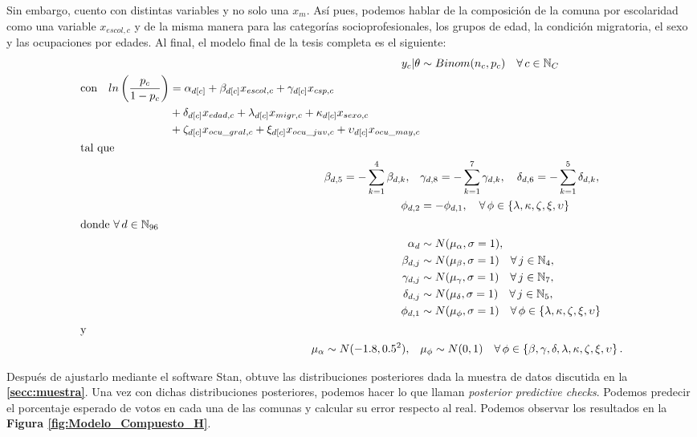 Sin embargo, cuento con distintas variables y no solo una $x_m$. Así pues, podemos hablar de la composición de la comuna por escolaridad como una variable $x_{escol,c}$ y de la misma manera para las categorías socioprofesionales, los grupos de edad, la condición migratoria, el sexo y las ocupaciones por edades. Al final, el modelo final de la tesis completa es el siguiente: 
\begin{align}\label{eq:Modelo_Comp_H}
y_c|\theta & \sim Binom(n_c,p_c) \quad \forall \, c \in \mathbb{N}_C \nonumber \\
\begin{split}
\text{con} \quad ln\left(\dfrac{p_c}{1-p_c}\right) &= \alpha_{d[c]} + \beta_{d[c]} x_{escol,c} + \gamma_{d[c]} x_{csp,c} \\
&+ \delta_{d[c]} x_{edad,c} + \lambda_{d[c]} x_{migr,c} + \kappa_{d[c]} x_{sexo,c} \\
&+ \zeta_{d[c]} x_{ocu\_gral,c} + \xi_{d[c]} x_{ocu\_juv,c} + \upsilon_{d[c]} x_{ocu\_may,c} 
\end{split}\\
\shortintertext{tal que} 
\beta_{d,5} = -\sum\limits_{k = 1}^{4} \beta_{d,k}, \quad &\gamma_{d,8} = -\sum\limits_{k = 1}^{7} \gamma_{d,k}, \quad \delta_{d,6} = -\sum\limits_{k = 1}^{5} \delta_{d,k}, \nonumber \\ 
\phi_{d,2} &= -\phi_{d,1}, \quad \forall \, \phi \in \left\lbrace \lambda, \kappa, \zeta, \xi, \upsilon \right\rbrace \nonumber \\
\shortintertext{donde $\forall \, d \in \mathbb{N}_{96}$}
\alpha_d &\sim N(\mu_{\alpha}, \sigma=1), \nonumber \\ 
\beta_{d,j} &\sim N(\mu_{\beta}, \sigma=1) \quad \forall \, j \in \mathbb{N}_{4}, \nonumber \\ 
\gamma_{d,j} &\sim N(\mu_{\gamma}, \sigma=1) \quad \forall \, j \in \mathbb{N}_{7}, \nonumber \\  
\delta_{d,j} &\sim N(\mu_{\delta}, \sigma=1) \quad \forall \, j \in \mathbb{N}_{5}, \nonumber \\ 
\phi_{d,1} &\sim N(\mu_{\phi}, \sigma=1) \quad \forall \, \phi \in \left\lbrace \lambda, \kappa, \zeta, \xi, \upsilon \right\rbrace \nonumber \\
\shortintertext{y} 
\mu_{\alpha} \sim N(-1.8,0.5^2), \quad &\mu_{\phi} \sim N(0,1)  \quad \forall \, \phi \in \left\lbrace \beta, \gamma, \delta, \lambda, \kappa, \zeta, \xi, \upsilon \right\rbrace. \nonumber 
\end{align}

Después de ajustarlo mediante el software Stan, obtuve las distribuciones posteriores dada la muestra de datos discutida en la \textbf{\autoref{secc:muestra}}. Una vez con dichas distribuciones posteriores, podemos hacer lo que \textcite{Gelman13} llaman \textit{posterior predictive checks}. Podemos predecir el porcentaje esperado de votos en cada una de las comunas y calcular su error respecto al real. Podemos observar los resultados en la \textbf{Figura \ref{fig:Modelo_Compuesto_H}}.\\

